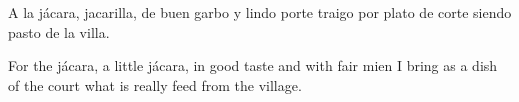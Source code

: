 \begin{texttranslation}
\begin{original}
A la jácara, jacarilla,
de buen garbo y lindo porte
traigo por plato de corte
siendo pasto de la villa.
\end{original}
\begin{translation}
For the jácara, a little jácara,
in good taste and with fair mien
I bring as a dish of the court
what is really feed from the village.
\end{translation}
\end{texttranslation}

